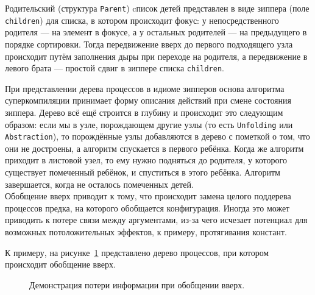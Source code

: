 Родительский (структура \lstinline{Parent}) cписок детей представлен в виде зиппера (поле \lstinline{children})
для списка, в котором происходит фокус: у непосредственного родителя --- на элемент в фокусе, а у остальных
родителей --- на предыдущего в порядке сортировки.
Тогда передвижение вверх до первого подходящего узла происходит путём
заполнения дыры при переходе на родителя, а передвижение в левого брата ---
простой сдвиг в зиппере списка \lstinline{children}.

При представлении дерева процессов в идиоме зипперов основа алгоритма
суперкомпиляции принимает форму описания действий при смене состояния зиппера.
Дерево всё ещё строится в глубину и происходит это следующим образом:
если мы в узле, порождающем другие узлы (то есть \lstinline{Unfolding}
или \lstinline{Abstraction}), то порождённые узлы добавляются в дерево
с пометкой о том, что они не достроены, а алгоритм спускается в первого
ребёнка. Когда же алгоритм приходит в листовой узел, то ему нужно подняться
до родителя, у которого существует помеченный ребёнок, и спуститься в этого
ребёнка. Алгоритм завершается, когда не осталось помеченных детей. \\

Обобщение вверх приводит к тому, что происходит замена целого поддерева процессов
предка, на которого обобщается конфигурация. Иногда это может приводить к потере
связи между аргументами, из-за чего исчезает потенциал для возможных
потоложительных эффектов, к примеру, протягивания констант.

К примеру, на рисунке~\ref{fig:genup} представлено дерево процессов, при котором происходит обобщение вверх.

\begin{figure}[h!]
\center
{}
\caption{Демонстрация потери информации при обобщении вверх.}
\label{fig:genup}
\end{figure}

